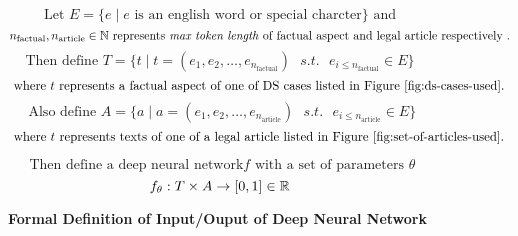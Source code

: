 \begin{figure}[ht]
    \[\text{ Let } E = \{e \mid e \text{ is an english word or special charcter} \} \text{ and }\]
    \[n_{\text{factual}}, n_{\text{article}} \in \Bbb N \text{ represents \textit{max token length} of factual aspect and legal article respectively }. \]
    \[\text{Then define } T = \{t \mid t = (e_1, e_2, \ldots , e_{n_\text{factual}}) \text{ } s.t. \text{ } e_{i \le{n_{\text{factual}}}  } \in E \} \]
    \[\text{ where } t \text{ represents a factual aspect of one of DS cases listed in Figure \ref{fig:ds-cases-used}. }\]
    \[\text{ Also define } A = \{a \mid a = (e_1, e_2, \ldots , e_{n_\text{article}}) \text{ } s.t. \text{ } e_{i \le{n_{\text{article}}}  } \in E \}  \]
    \[\text{ where } t \text{ represents texts of one of a legal article listed in Figure \ref{fig:set-of-articles-used}. }\]

    \[\text{ Then define a deep neural network} f \text{ with a set of parameters } \theta \]
    \[f_{\theta}: T \times A \to [0, 1] \in \Bbb R \]


    \caption{\textbf{Formal Definition of Input/Ouput of Deep Neural Network}}
    \label{fig:def:io:nn}

\end{figure}